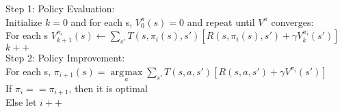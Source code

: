 \documentclass[11pt, a4paper]{article}
\DeclareMathOperator*{\argmax}{\arg\!\max}
\begin{document}
\begin{multicols*}{1}
            \hspace*{10 mm}Step 1: Policy Evaluation:\\
            \hspace*{15 mm}Initialize $k = 0$ and for each s, $V_0^\pi(s) = 0$ and repeat until $V^\pi$ converges:\\
            \hspace*{15 mm}For each s $V_{k + 1}^{\pi_i}(s) \gets \sum\limits_{s'} T(s, \pi_i(s), s') [R(s, \pi_i(s), s') + \gamma V_k^{\pi_i}(s')]$\\
            \hspace*{15 mm}$k++$\\
            \hspace*{10 mm}Step 2: Policy Improvement:\\
            \hspace*{15 mm}For each s, $\pi_{i + 1}(s) = \argmax\limits_{a} \sum\limits_{s'} T(s, a, s') [R(s, a, s') + \gamma V^{\pi_i}(s')]$\\
            \hspace*{15 mm}If $\pi_i == \pi_{i + 1}$, then it is optimal\\
            \hspace*{15 mm}Else let $i++$
    \end{multicols*}
\end{document}

